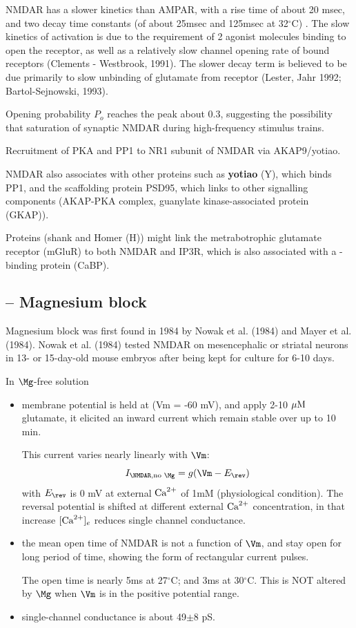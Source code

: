 NMDAR has a slower kinetics than AMPAR, with a rise time of about 20 msec, and
two decay time constants (of about 25msec and 125msec at 32$^\circ$C)
\citep{hestrin1990}. The slow kinetics of activation is due to the requirement
of 2 agonist molecules binding to open the receptor, as well as a relatively
slow channel opening rate of bound receptors (Clements - Westbrook, 1991). The
slower decay term is believed to be due primarily to slow unbinding of glutamate
from receptor (Lester, Jahr 1992; Bartol-Sejnowski, 1993).

Opening probability $P_o$ reaches the peak about 0.3, suggesting the possibility
that saturation of synaptic NMDAR during high-frequency stimulus trains.

Recruitment of PKA and PP1 to NR1 subunit of NMDAR via AKAP9/yotiao.

NMDAR also associates with other proteins such as {\bf yotiao} (Y), which binds
PP1, and the scaffolding protein PSD95, which links to other signalling
components (AKAP-PKA complex, guanylate kinase-associated protein (GKAP)).

Proteins (shank and Homer (H)) might link the metrabotrophic glutamate
receptor (mGluR) to both NMDAR and IP3R, which is also associated with
a -binding protein (CaBP).


\subsection{-- Magnesium block}

Magnesium block was first found in 1984 by Nowak et al. (1984) and Mayer et al.
(1984). Nowak et al. (1984) tested NMDAR on mesencephalic or striatal neurons in
13- or 15-day-old mouse embryos after being kept for culture for 6-10 days.

In $\Mg$-free solution
\begin{itemize}
  \item  membrane potential is held at (Vm = -60 mV), and apply 2-10 ${\mu\text{M}}$
  glutamate, it elicited an inward current which remain stable over up to 10
  min. 
  
  This current varies nearly linearly with $\Vm$:
  \begin{equation}
  I_{\NMDAR, \text{no $\Mg$}} = g (\Vm - E_\rev)
  \end{equation}
  with $E_\rev$ is 0 mV at external ${\text{Ca}^{2+}}$ of 1mM (physiological condition). 
  The reversal potential is shifted at different external ${\text{Ca}^{2+}}$ concentration,
  in that increase $[{\text{Ca}^{2+}}]_e$ reduces single channel conductance.

  \item the mean open time of NMDAR is not a function of $\Vm$, and stay open
  for long period of time, showing the form of rectangular current pulses.
  
  The open time is nearly 5ms at 27$^\circ$C; and 3ms at 30$^\circ$C.
  This is NOT altered by $\Mg$ when $\Vm$ is in the positive potential range. 
   
  \item single-channel conductance is about 49$\pm$8 pS. 
\end{itemize}

